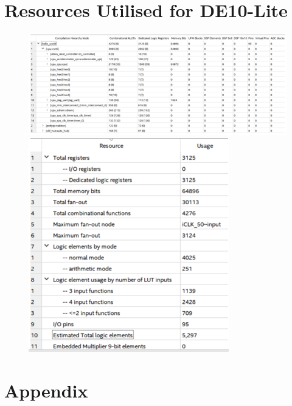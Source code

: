 \documentclass[12pt,a4paper]{article}
\begin{document}
\section{\normalsize Resources Utilised for DE10-Lite}

\begin{figure} [h!]
    \includegraphics[scale = 0.8]{Res1.png}
    \includegraphics[scale = 0.6]{Res2.PNG}
\end{figure}

\newpage
\section{\normalsize Appendix}
\end{document}
